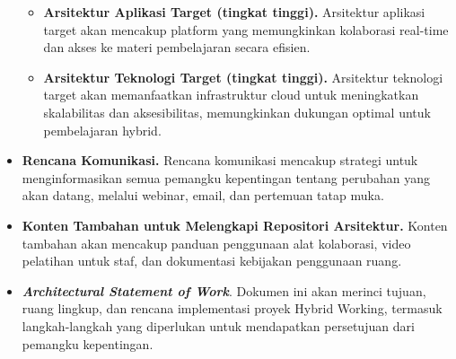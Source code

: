 \begin{itemize}
\begin{itemize}
		\item \textbf{Arsitektur Aplikasi Target (tingkat tinggi).} 
		Arsitektur aplikasi target akan mencakup platform yang memungkinkan kolaborasi real-time dan akses ke materi pembelajaran secara efisien.
		
		\item \textbf{Arsitektur Teknologi Target (tingkat tinggi).} 
		Arsitektur teknologi target akan memanfaatkan infrastruktur cloud untuk meningkatkan skalabilitas dan aksesibilitas, memungkinkan dukungan optimal untuk pembelajaran hybrid.
	\end{itemize}
	
	\item \textbf{Rencana Komunikasi.} 
	Rencana komunikasi mencakup strategi untuk menginformasikan semua pemangku kepentingan tentang perubahan yang akan datang, melalui webinar, email, dan pertemuan tatap muka.
	
	\item \textbf{Konten Tambahan untuk Melengkapi Repositori Arsitektur.} 
	Konten tambahan akan mencakup panduan penggunaan alat kolaborasi, video pelatihan untuk staf, dan dokumentasi kebijakan penggunaan ruang.
	
	\item \textit{\textbf{Architectural Statement of Work}}. 
	Dokumen ini akan merinci tujuan, ruang lingkup, dan rencana implementasi proyek Hybrid Working, termasuk langkah-langkah yang diperlukan untuk mendapatkan persetujuan dari pemangku kepentingan.
\end{itemize}

